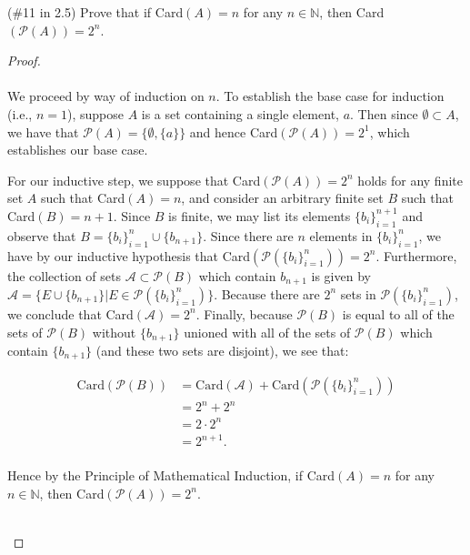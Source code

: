 (\#11 in 2.5) Prove that if Card$(A) = n$ for any $n\in \mathbb{N}$, then
Card$(\mathcal{P}(A))=2^n$.

    \begin{proof}\ \\\\
        We proceed by way of induction on $n$. To establish the base case for
        induction (i.e., $n = 1$), suppose $A$ is a set containing a single
        element, $a$. Then since $\emptyset \subset A$, we have that
        $\mathcal{P}(A) = \{\emptyset, \{a\}\}$ and hence 
        Card$\left(\mathcal{P}(A)\right) = 2^1$, which establishes our base
        case.

        For our inductive step, we suppose that 
        Card$\left(\mathcal{P}(A)\right) = 2^n$ holds for any finite set $A$
        such that Card$(A) = n$, and consider an arbitrary finite set $B$ such
        that Card$(B) = n + 1$. Since $B$ is finite, we may list its elements
        $\{b_i\}_{i=1}^{n+1}$ and observe that 
        $B = \{b_i\}_{i=1}^n \cup \{b_{n+1}\}$. Since there are $n$ elements in
        $\{b_i\}_{i=1}^n$, we have by our inductive hypothesis that
        Card$\left(\mathcal{P}\left(\{b_i\}_{i=1}^n\right)\right) = 2^n$.
        Furthermore, the collection of sets $\mathcal{A} \subset \mathcal{P}(B)$
        which contain
        $b_{n+1}$ is given by $\mathcal{A} = \{E \cup \{b_{n+1}\} | E \in \mathcal{P}\left(\{b_i\}_{i=1}^n\right)\}$.
        Because there are $2^n$ sets in $\mathcal{P}\left(\{b_i\}_{i=1}^n\right)$,
        we conclude that Card$(\mathcal{A}) = 2^n$. Finally, because
        $\mathcal{P}(B)$ is equal to all of the sets of $\mathcal{P}(B)$
        without $\{b_{n+1}\}$ unioned with all of the sets of $\mathcal{P}(B)$
        which contain $\{b_{n+1}\}$ (and these two sets are disjoint), we
        see that:

        \begin{align*}
            \text{Card}\left(\mathcal{P}(B)\right) 
              &= \text{Card}\left(\mathcal{A}\right)
                 + \text{Card}\left(\mathcal{P}\left(\{b_i\}_{i=1}^n\right)\right) \\
              &= 2^n + 2^n \\
              &= 2 \cdot 2^n \\
              &= 2^{n+1}. \\
        \end{align*}

        Hence by the Principle of Mathematical Induction, if Card$(A) = n$ for
        any $n \in \mathbb{N}$, then Card$\left(\mathcal{P}(A)\right) = 2^n$.

        \ \\
    \end{proof}